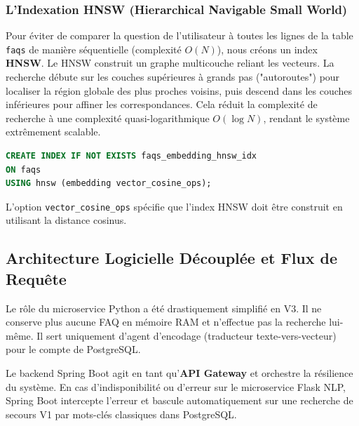 \documentclass[11pt,a4paper]{article}
\begin{document}
\subsubsection{L'Indexation HNSW (Hierarchical Navigable Small World)}
Pour éviter de comparer la question de l'utilisateur à toutes les lignes de la table \texttt{faqs} de manière séquentielle (complexité $O(N)$), nous créons un index \textbf{HNSW}.
Le HNSW construit un graphe multicouche reliant les vecteurs. La recherche débute sur les couches supérieures à grands pas ("autoroutes") pour localiser la région globale des plus proches voisins, puis descend dans les couches inférieures pour affiner les correspondances. Cela réduit la complexité de recherche à une complexité quasi-logarithmique $O(\log N)$, rendant le système extrêmement scalable.

\begin{lstlisting}[language=SQL, caption=Création de l'index HNSW dans PostgreSQL]
CREATE INDEX IF NOT EXISTS faqs_embedding_hnsw_idx
ON faqs
USING hnsw (embedding vector_cosine_ops);
\end{lstlisting}
L'option \texttt{vector\_cosine\_ops} spécifie que l'index HNSW doit être construit en utilisant la distance cosinus.

\subsection{Architecture Logicielle Découplée et Flux de Requête}

Le rôle du microservice Python a été drastiquement simplifié en V3. Il ne conserve plus aucune FAQ en mémoire RAM et n'effectue pas la recherche lui-même. Il sert uniquement d'agent d'encodage (traducteur texte-vers-vecteur) pour le compte de PostgreSQL.

Le backend Spring Boot agit en tant qu'\textbf{API Gateway} et orchestre la résilience du système. En cas d'indisponibilité ou d'erreur sur le microservice Flask NLP, Spring Boot intercepte l'erreur et bascule automatiquement sur une recherche de secours V1 par mots-clés classiques dans PostgreSQL.
\end{document}
